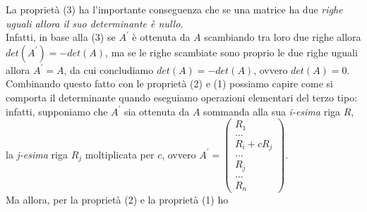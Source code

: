 \clearpage              
La proprietà (3) ha l'importante conseguenza che se una matrice ha due {\it righe uguali allora
  il suo determinante è nullo.}\\
Infatti, in base alla (3) se $A^\prime$ è ottenuta da $A$ scambiando tra loro due righe allora
$det(A^\prime)=-det(A)$, ma se le righe scambiate sono proprio le due righe uguali allora
$A^\prime=A$, da cui concludiamo $det(A)=-det(A)$, ovvero $det(A)=0$. Combinando questo fatto
con le proprietà (2) e (1) possiamo capire come si comporta il determinante quando eseguiamo
operazioni elementari del terzo tipo: infatti, supponiamo che $A^\prime$ sia ottenuta da $A$
sommanda alla sua {\it i-esima} riga $R$, la {\it j-esima} riga $R_j$ moltiplicata per $c$,
ovvero $A^\prime =\begin{pmatrix}
R_1\\
\dots\\
R_i +cR_j\\
\dots\\
R_j\\
\dots\\
R_n
\end{pmatrix}
$.\\
Ma allora, per la proprietà (2) e la proprietà (1) ho
